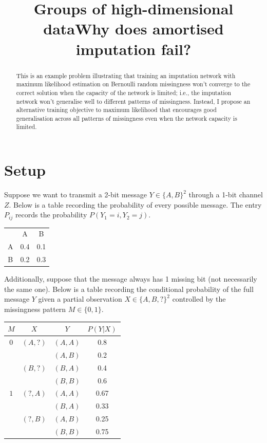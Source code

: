 \documentclass[a4paper,12pt]{article}
\title{\bf Groups of high-dimensional data}
\author{}
\date{}
\title{Why does amortised imputation fail?}
\begin{document}
\allsectionsfont{\sffamily}



\maketitle

\begin{abstract}
   This is an example problem illustrating that training an imputation network with maximum likelihood estimation on Bernoulli random missingness won't converge to the correct solution when the capacity of the network is limited; i.e., the imputation network won't generalise well to different patterns of missingness. Instead, I propose an alternative training objective to maximum likelihood that encourages good generalisation across all patterns of missingness even when the network capacity is limited.
\end{abstract}

\section{Setup} 

Suppose we want to transmit a 2-bit message $Y \in \{A,B\}^2$ through a 1-bit channel $Z$. Below is a table recording the probability of every possible message. The entry $P_{ij}$ records the probability $P(Y_1 = i, Y_2 = j)$.

\begin{tabular}{c c c}
   & A & B \\
   A & 0.4 & 0.1 \\
   B & 0.2 & 0.3
\end{tabular}

Additionally, suppose that the message always has 1 missing bit (not necessarily the same one). Below is a table recording the conditional probability of the full message $Y$ given a partial observation $X \in \{A,B,?\}^2$ controlled by the missingness pattern $M \in \{0,1\}$.

\begin{tabular}{c c c c}
   $M$ & $X$ & $Y$ & $P(Y | X)$ \\ \hline
   $0$ & $(A,?)$ & $(A,A)$ & 0.8 \\
    &  & $(A,B)$ & 0.2 \\
    & $(B,?)$ & $(B,A)$ & 0.4 \\
    & & $(B,B)$ & 0.6 \\
   $1$ & $(?,A)$ & $(A,A)$ & 0.67 \\
    &  & $(B,A)$ & 0.33 \\
    & $(?,B)$ & $(A,B)$ & 0.25 \\
    & & $(B,B)$ & 0.75 \\
\end{tabular}
\end{document}
